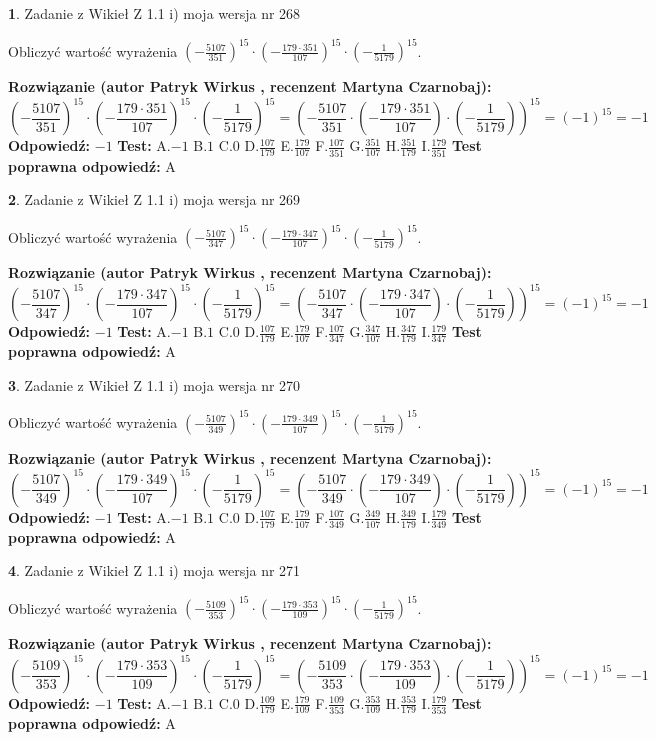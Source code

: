 \documentclass[12pt, a4paper]{article}
\theoremstyle{definition} %
\newtheorem{zad}{}
\newcommand{\zadStart}[1]{\begin{zad}#1\newline}
\newcommand{\zadStop}{\end{zad}}
\newcommand{\rozwStart}[2]{\noindent \textbf{Rozwiązanie (autor #1 , recenzent #2): }\newline}
\newcommand{\rozwStop}{\newline}
\newcommand{\odpStart}{\noindent \textbf{Odpowiedź:}\newline}
\newcommand{\odpStop}{\newline}
\newcommand{\testStart}{\noindent \textbf{Test:}\newline}
\newcommand{\testStop}{\newline}
\newcommand{\kluczStart}{\noindent \textbf{Test poprawna odpowiedź:}\newline}
\newcommand{\kluczStop}{\newline}
\begin{document}
\zadStart{Zadanie z Wikieł Z 1.1 i) moja wersja nr 268}

Obliczyć wartość wyrażenia $(-\frac{5107}{351})^{15} \cdot (-\frac{179 \cdot 351}{107})^{15} \cdot (-\frac{1}{5179})^{15}$.
\zadStop
\rozwStart{Patryk Wirkus}{Martyna Czarnobaj}
$$(-\frac{5107}{351})^{15} \cdot (-\frac{179 \cdot 351}{107})^{15} \cdot (-\frac{1}{5179})^{15} = (-\frac{5107}{351} \cdot (-\frac{179 \cdot 351}{107}) \cdot (-\frac{1}{5179}))^{15} = (-1)^{15} = -1$$
\rozwStop
\odpStart
$-1$
\odpStop
\testStart
A.$-1$ B.$1$ C.$0$ D.$\frac{107}{179}$ E.$\frac{179}{107}$
F.$\frac{107}{351}$ G.$\frac{351}{107}$
H.$\frac{351}{179}$
I.$\frac{179}{351}$
\testStop
\kluczStart
A
\kluczStop



\zadStart{Zadanie z Wikieł Z 1.1 i) moja wersja nr 269}

Obliczyć wartość wyrażenia $(-\frac{5107}{347})^{15} \cdot (-\frac{179 \cdot 347}{107})^{15} \cdot (-\frac{1}{5179})^{15}$.
\zadStop
\rozwStart{Patryk Wirkus}{Martyna Czarnobaj}
$$(-\frac{5107}{347})^{15} \cdot (-\frac{179 \cdot 347}{107})^{15} \cdot (-\frac{1}{5179})^{15} = (-\frac{5107}{347} \cdot (-\frac{179 \cdot 347}{107}) \cdot (-\frac{1}{5179}))^{15} = (-1)^{15} = -1$$
\rozwStop
\odpStart
$-1$
\odpStop
\testStart
A.$-1$ B.$1$ C.$0$ D.$\frac{107}{179}$ E.$\frac{179}{107}$
F.$\frac{107}{347}$ G.$\frac{347}{107}$
H.$\frac{347}{179}$
I.$\frac{179}{347}$
\testStop
\kluczStart
A
\kluczStop



\zadStart{Zadanie z Wikieł Z 1.1 i) moja wersja nr 270}

Obliczyć wartość wyrażenia $(-\frac{5107}{349})^{15} \cdot (-\frac{179 \cdot 349}{107})^{15} \cdot (-\frac{1}{5179})^{15}$.
\zadStop
\rozwStart{Patryk Wirkus}{Martyna Czarnobaj}
$$(-\frac{5107}{349})^{15} \cdot (-\frac{179 \cdot 349}{107})^{15} \cdot (-\frac{1}{5179})^{15} = (-\frac{5107}{349} \cdot (-\frac{179 \cdot 349}{107}) \cdot (-\frac{1}{5179}))^{15} = (-1)^{15} = -1$$
\rozwStop
\odpStart
$-1$
\odpStop
\testStart
A.$-1$ B.$1$ C.$0$ D.$\frac{107}{179}$ E.$\frac{179}{107}$
F.$\frac{107}{349}$ G.$\frac{349}{107}$
H.$\frac{349}{179}$
I.$\frac{179}{349}$
\testStop
\kluczStart
A
\kluczStop



\zadStart{Zadanie z Wikieł Z 1.1 i) moja wersja nr 271}

Obliczyć wartość wyrażenia $(-\frac{5109}{353})^{15} \cdot (-\frac{179 \cdot 353}{109})^{15} \cdot (-\frac{1}{5179})^{15}$.
\zadStop
\rozwStart{Patryk Wirkus}{Martyna Czarnobaj}
$$(-\frac{5109}{353})^{15} \cdot (-\frac{179 \cdot 353}{109})^{15} \cdot (-\frac{1}{5179})^{15} = (-\frac{5109}{353} \cdot (-\frac{179 \cdot 353}{109}) \cdot (-\frac{1}{5179}))^{15} = (-1)^{15} = -1$$
\rozwStop
\odpStart
$-1$
\odpStop
\testStart
A.$-1$ B.$1$ C.$0$ D.$\frac{109}{179}$ E.$\frac{179}{109}$
F.$\frac{109}{353}$ G.$\frac{353}{109}$
H.$\frac{353}{179}$
I.$\frac{179}{353}$
\testStop
\kluczStart
A
\kluczStop
\end{document}
